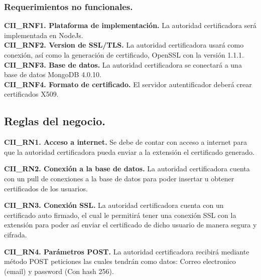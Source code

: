 \documentclass[12pt, a4paper, titlepage]{report}
\begin{document}
	            \subsubsection{Requerimientos no funcionales.}
	            {\setlength{\parindent}{12pt}
				
				\textbf{CII\_RNF1. Plataforma de implementación.} La autoridad certificadora será implementada en NodeJs.\\
				
				\textbf{CII\_RNF2. Version de SSL/TLS.} La autoridad certificadora usará como conexión, así como la generación de certificado, OpenSSL con la versión 1.1.1.\\
				
				\textbf{CII\_RNF3. Base de datos.} La autoridad certificadora se conectará a una base de datos MongoDB 4.0.10.\\
				
				\textbf{CII\_RNF4. Formato de certificado.} El servidor autentificador deberá crear certificados X509.
			}
	            
	            
	        \subsection{Reglas del negocio.}
	        
	        \textbf{CII\_RN1. Acceso a internet.} Se debe de contar con acceso a internet para que la autoridad certificadora pueda enviar a la extensión el certificado generado.\\
            \label{CII_RN1}
            
            \textbf{CII\_RN2. Conexión a la base de datos.} La autoridad certificadora cuenta con un pull de conexiones a la base de datos para poder insertar u obtener certificados de los usuarios.\\
            \label{CII_RN2}
            
            \textbf{CII\_RN3. Conexión SSL.} La autoridad certificadora cuenta con un certificado auto firmado, el cual le permitirá tener una conexión SSL con la extensión para poder así enviar el certificado de dicho usuario de manera segura y cifrada.\\
            \label{CII_RN3}
          
            \textbf{CII\_RN4. Parámetros POST.} La autoridad certificadora recibirá mediante método POST peticiones las cuales tendrán como datos: Correo electronico (email) y password (Con hash 256).\\
            \label{CII_RN4}
            
\end{document}
